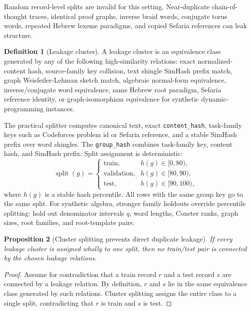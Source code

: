 \documentclass[11pt]{article}
\theoremstyle{definition}
\newtheorem{definition}{Definition}[section]
\theoremstyle{plain}
\newtheorem{proposition}[definition]{Proposition}
\theoremstyle{remark}
\numberwithin{equation}{section}
\begin{document}
Random record-level splits are invalid for this setting.  Near-duplicate chain-of-thought traces, identical proof graphs, inverse braid words, conjugate torus words, repeated Hebrew lexeme paradigms, and copied Sefaria references can leak structure.

\begin{definition}[Leakage cluster]
A leakage cluster is an equivalence class generated by any of the following high-similarity relations: exact normalized-content hash, source-family key collision, text shingle SimHash prefix match, graph Weisfeiler-Lehman sketch match, algebraic normal-form equivalence, inverse/conjugate word equivalence, same Hebrew root paradigm, Sefaria reference identity, or graph-isomorphism equivalence for synthetic dynamic-programming instances.
\end{definition}

The practical splitter computes canonical text, exact \texttt{content\_hash}, task-family keys such as Codeforces problem id or Sefaria reference, and a stable SimHash prefix over word shingles.  The \texttt{group\_hash} combines task-family key, content hash, and SimHash prefix.  Split assignment is deterministic:
\begin{equation}
  \operatorname{split}(g)=
  \begin{cases}
  \text{train}, & h(g)\in[0,80),\\
  \text{validation}, & h(g)\in[80,90),\\
  \text{test}, & h(g)\in[90,100),
  \end{cases}
\end{equation}
where $h(g)$ is a stable hash percentile.  All rows with the same group key go to the same split.  For synthetic algebra, stronger family holdouts override percentile splitting: hold out denominator intervals $q$, word lengths, Coxeter ranks, graph sizes, root families, and root-template pairs.

\begin{proposition}[Cluster splitting prevents direct duplicate leakage]
If every leakage cluster is assigned wholly to one split, then no train/test pair is connected by the chosen leakage relations.
\end{proposition}

\begin{proof}
Assume for contradiction that a train record $r$ and a test record $s$ are connected by a leakage relation.  By definition, $r$ and $s$ lie in the same equivalence class generated by such relations.  Cluster splitting assigns the entire class to a single split, contradicting that $r$ is train and $s$ is test.
\end{proof}
\end{document}
